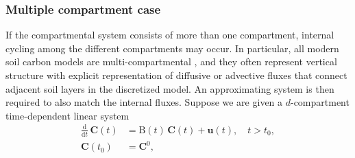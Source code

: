 \documentclass[draft]{agujournal2019}
\renewcommand{\vec}[1]{\mathbf{#1}}
\newcommand{\tens}[1]{\mathrm{#1}}
\newcommand{\deriv}[1]{\frac{\mathrm{d}}{\mathrm{d}#1}}
\begin{document}
    \subsubsection{Multiple compartment case}
        If the compartmental system consists of more than one compartment, internal cycling among the different compartments may occur. In particular, all modern soil carbon models are multi-compartmental \cite{Manzoni2009SBB, Sierra2015}, and they often represent vertical structure with explicit representation of diffusive or advective fluxes that connect adjacent soil layers in the discretized model.
        An approximating system is then required to also match the internal fluxes.
        Suppose we are given a $d$-compartment time-dependent linear system
        \begin{equation}\label{eqn:CS_multi_dim}
            \begin{aligned}
                \deriv{t}\,\vec{C}(t) &= \tens{B}(t)\,\vec{C}(t) + \vec{u}(t),\quad t>t_0,\\
                \vec{C}(t_0) &= \vec{C}^0,
            \end{aligned}
        \end{equation}
\end{document}
